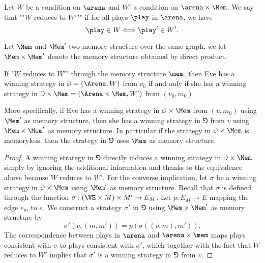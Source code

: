 Let $W$ be a condition on $\arena$ and $W'$ a condition on $\arena \times \Mem$.
We say that ""$W$ reduces to $W'$"" if for all plays $\play$ in $\arena$,
we have 
\[
\play \in W \Longleftrightarrow \play' \in W'.
\]

Let $\Mem$ and $\Mem'$ two memory structure over the same graph, 
we let $\Mem \times \Mem'$ denote the memory structure obtained by direct product.

\begin{lemma}
\label{1-lem:memory_structure_reduction}
If "$W$ reduces to $W'$" through the memory structure $\mem$, then
Eve has a winning strategy in $\Game = (\Arena,W)$ from $v_0$ if and only if 
she has a winning strategy in $\Game \times \Mem = (\Arena \times \Mem, W')$ from $(v_0,m_0)$. 

More specifically, if Eve has a winning strategy in $\Game \times \Mem$ from $(v,m_0)$ using $\Mem'$ as memory structure, 
then she has a winning strategy in $\Game$ from $v$ using $\Mem \times \Mem'$ as memory structure.
In particular if the strategy in $\Game \times \Mem$ is memoryless, then the strategy in $\Game$ uses $\Mem$ as memory structure.
\end{lemma}
\begin{proof}
A winning strategy in $\Game$ directly induces a winning strategy in $\Game \times \Mem$ simply by ignoring the additional information
and thanks to the equivalence above because $W$ reduces to $W'$.
For the converse implication, let $\sigma$ be a winning strategy in $\Game \times \Mem$ using $\Mem'$ as memory structure.
Recall that $\sigma$ is defined through the function $\sigma : (\VE \times M) \times M' \to E_M$.
Let $p : E_M \to E$ mapping the edge $e_m$ to $e$.
We construct a strategy $\sigma'$ in $\Game$ using $\Mem \times \Mem'$ as memory structure by
\[
\sigma'(v, (m,m')) = p(\sigma((v,m), m')).
\]
The correspondence between plays in $\arena$ and $\arena \times \mem$ maps plays consistent with $\sigma$ to plays consistent with $\sigma'$,
which together with the fact that $W$ reduces to $W'$ implies that $\sigma'$ is a winning strategy in $\Game$ from $v$.
\end{proof}

